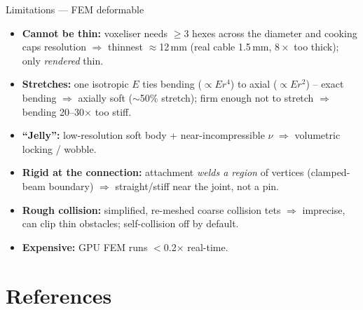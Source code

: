 \documentclass[aspectratio=169]{beamer}
\begin{document}
\begin{frame}{Limitations --- FEM deformable}
  \footnotesize
  \begin{itemize}\itemsep1pt
    \item \textbf{Cannot be thin:} voxeliser needs $\geq$3 hexes across the diameter and
          cooking caps resolution $\Rightarrow$ thinnest $\approx$12\,mm (real cable
          1.5\,mm, $8\times$ too thick); only \emph{rendered} thin.
    \item \textbf{Stretches:} one isotropic $E$ ties bending ($\propto E r^4$) to axial
          ($\propto E r^2$) -- exact bending $\Rightarrow$ axially soft ($\sim$50\%
          stretch); firm enough not to stretch $\Rightarrow$ bending 20--30$\times$ too stiff.
    \item \textbf{``Jelly'':} low-resolution soft body + near-incompressible $\nu$
          $\Rightarrow$ volumetric locking / wobble.
    \item \textbf{Rigid at the connection:} attachment \emph{welds a region} of vertices
          (clamped-beam boundary) $\Rightarrow$ straight/stiff near the joint, not a pin.
    \item \textbf{Rough collision:} simplified, re-meshed coarse collision tets
          $\Rightarrow$ imprecise, can clip thin obstacles; self-collision off by default.
    \item \textbf{Expensive:} GPU FEM runs $<$0.2$\times$ real-time.
  \end{itemize}
\end{frame}

\section{References}
\end{document}
